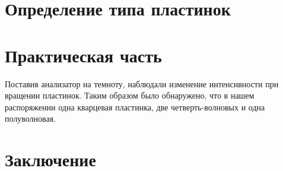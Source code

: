 \section{Определение типа пластинок}


\section{Практическая часть}
Поставив анализатор на темноту, наблюдали изменение интенсивности при вращении пластинок. 
Таким образом было обнаружено, что в нашем распоряжении одна кварцевая пластинка, две четверть-волновых и одна полуволновая.




\newpage
\section{Заключение}

